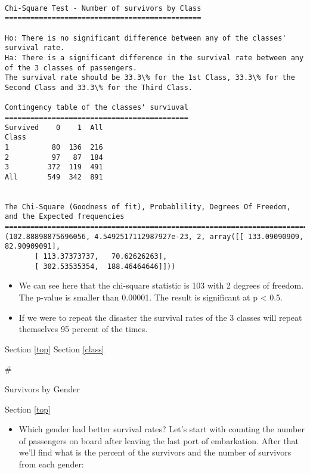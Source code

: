 \documentclass[11pt]{article}
\providecommand{\tightlist}{%
      \setlength{\itemsep}{0pt}\setlength{\parskip}{0pt}}
\begin{document}
    \begin{Verbatim}[commandchars=\\\{\}]

Chi-Square Test - Number of survivors by Class
==============================================

Ho: There is no significant difference between any of the classes' survival rate.
Ha: There is a significant difference in the survival rate between any of the 3 classes of passengers.
The survival rate should be 33.3\% for the 1st Class, 33.3\% for the Second Class and 33.3\% for the Third Class.

Contingency table of the classes' surviuval
===========================================
Survived    0    1  All
Class                  
1          80  136  216
2          97   87  184
3         372  119  491
All       549  342  891


The Chi-Square (Goodness of fit), Probablility, Degrees Of Freedom, and the Expected frequencies
==============================================================================
(102.88898875696056, 4.5492517112987927e-23, 2, array([[ 133.09090909,   82.90909091],
       [ 113.37373737,   70.62626263],
       [ 302.53535354,  188.46464646]]))

    \end{Verbatim}

    \begin{itemize}
\tightlist
\item
  We can see here that the chi-square statistic is 103 with 2 degrees of
  freedom. The p-value is smaller than 0.00001. The result is
  significant at p \textless{} 0.5.
\item
  If we were to repeat the disaster the survival rates of the 3 classes
  will repeat themselves 95 percent of the times.
\end{itemize}

    Section \ref{top} Section \ref{class}

     \#

Survivors by Gender

Section \ref{top}

    \begin{itemize}
\tightlist
\item
  Which gender had better survival rates? Let's start with counting the
  number of passengers on board after leaving the last port of
  embarkation. After that we'll find what is the percent of the
  survivors and the number of survivors from each gender:
\end{itemize}
\end{document}
